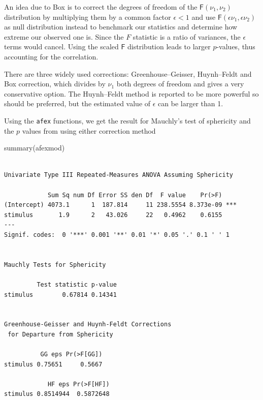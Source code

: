 \documentclass[
  11pt,
  letterpaper,
]{scrbook}
\newenvironment{Shaded}{\begin{snugshade}}{\end{snugshade}}
\newcommand{\FunctionTok}[1]{\textcolor[rgb]{0.28,0.35,0.67}{#1}}
\newcommand{\NormalTok}[1]{\textcolor[rgb]{0.00,0.23,0.31}{#1}}
\theoremstyle{definition}
\theoremstyle{remark}
\begin{document}
An idea due to Box is to correct the degrees of freedom of the
\(\mathsf{F}(\nu_1, \nu_2)\) distribution by multiplying them by a
common factor \(\epsilon<1\) and use
\(\mathsf{F}(\epsilon\nu_1, \epsilon\nu_2)\) as null distribution
instead to benchmark our statistics and determine how extreme our
observed one is. Since the \(F\) statistic is a ratio of variances, the
\(\epsilon\) terms would cancel. Using the scaled \(\mathsf{F}\)
distribution leads to larger \(p\)-values, thus accounting for the
correlation.

There are three widely used corrections: Greenhouse--Geisser,
Huynh--Feldt and Box correction, which divides by \(\nu_1\) both degrees
of freedom and gives a very conservative option. The Huynh--Feldt method
is reported to be more powerful so should be preferred, but the
estimated value of \(\epsilon\) can be larger than 1.

Using the \texttt{afex} functions, we get the result for Mauchly's test
of sphericity and the \(p\) values from using either correction method

\begin{Shaded}
\begin{Highlighting}[]
\FunctionTok{summary}\NormalTok{(afexmod)}
\end{Highlighting}
\end{Shaded}

\begin{verbatim}

Univariate Type III Repeated-Measures ANOVA Assuming Sphericity

            Sum Sq num Df Error SS den Df  F value    Pr(>F)    
(Intercept) 4073.1      1  187.814     11 238.5554 8.373e-09 ***
stimulus       1.9      2   43.026     22   0.4962    0.6155    
---
Signif. codes:  0 '***' 0.001 '**' 0.01 '*' 0.05 '.' 0.1 ' ' 1


Mauchly Tests for Sphericity

         Test statistic p-value
stimulus        0.67814 0.14341


Greenhouse-Geisser and Huynh-Feldt Corrections
 for Departure from Sphericity

          GG eps Pr(>F[GG])
stimulus 0.75651     0.5667

            HF eps Pr(>F[HF])
stimulus 0.8514944  0.5872648
\end{verbatim}
\end{document}

